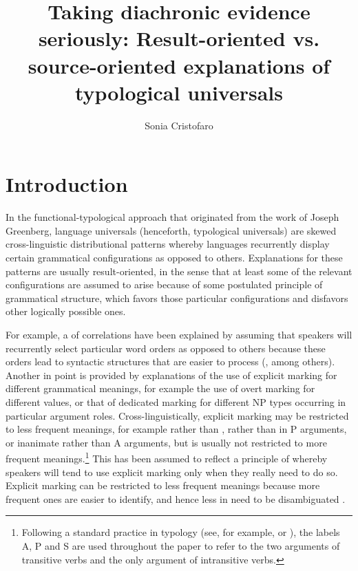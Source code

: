 \documentclass[output=paper]{langsci/langscibook}
\author{Sonia Cristofaro\affiliation{University of Pavia}}
\title{Taking diachronic evidence seriously: Result-oriented  vs. source-oriented explanations of typological universals}
\begin{document}
\maketitle 
  
\label{p:cristofaro:evidenceseriously}
 

\section{Introduction}\label{intro}
In the functional-typological approach that originated from the work
of Joseph Greenberg, language universals (henceforth, typological
universals) are skewed cross-linguistic distributional patterns whereby languages recurrently display certain grammatical configurations as opposed to others. Explanations for these patterns are usually result-oriented, in the sense  that at least some of the relevant configurations are assumed to arise because of some postulated principle of grammatical structure, which favors those particular configurations and disfavors other logically possible ones.

For example, a  of  correlations have been explained by assuming that speakers will recurrently select particular word orders as opposed to others because these orders lead to syntactic structures that are easier to process (\citealt{Hawkins2004},  among others). Another  in point is provided by explanations of the use of explicit marking for different grammatical meanings, for example the use of overt marking for different  values, or that of dedicated  marking for different NP types occurring in particular argument roles. Cross-linguistically, explicit marking may be restricted to less frequent meanings, for example  rather than ,  rather than
in P arguments, or inanimate rather than  A arguments, but
is usually not restricted to more frequent meanings.\footnote{Following a standard
    practice in typology (see, for example, \citealt{Comrie2} or \citealt{Dixon1994}), the labels A, P and S are used throughout
    the paper to refer to the two arguments of transitive verbs and
    the only argument of intransitive verbs.} This has been assumed to reflect a principle of  whereby speakers will tend to use explicit marking only when they really need to do so. Explicit marking can be restricted to less frequent meanings because more frequent ones are easier to identify, and hence less in need to be disambiguated
\citep{Greenberg1966,Corbett2000,TU2,Martinmarkedness,Haspelmath2008}. 
\end{document}
